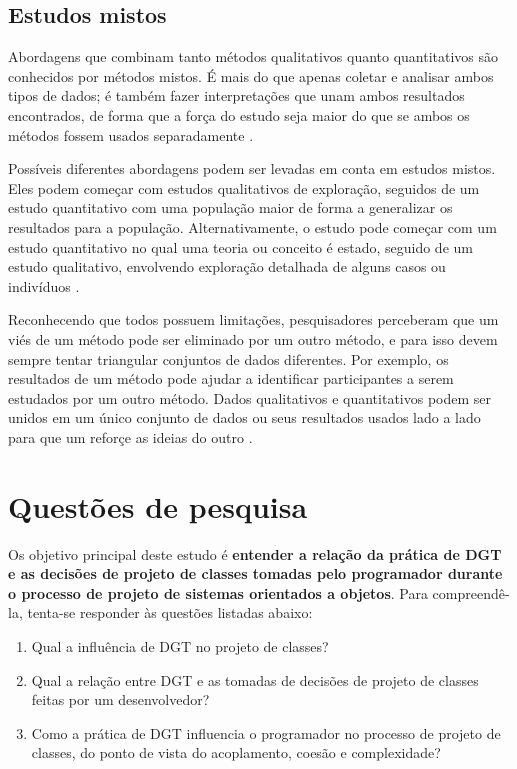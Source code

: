 \subsection{Estudos mistos}

Abordagens que combinam tanto métodos qualitativos quanto quantitativos são conhecidos por métodos mistos. 
É mais do que apenas coletar e analisar ambos tipos de dados; é também fazer interpretações que unam ambos
resultados encontrados, de forma que a força do estudo seja maior do que se ambos os métodos fossem
usados separadamente \cite{creswell}.

Possíveis diferentes abordagens podem ser levadas em conta em estudos mistos. Eles podem começar com estudos
qualitativos de exploração, seguidos de um estudo quantitativo com uma população maior de forma a
generalizar os resultados para a população. Alternativamente, o estudo pode começar com um estudo quantitativo
no qual uma teoria ou conceito é estado, seguido de um estudo qualitativo, envolvendo exploração detalhada
de alguns casos ou indivíduos \cite{creswell}.

Reconhecendo que todos possuem limitações, pesquisadores perceberam que um viés de um método pode ser eliminado
por um outro método, e para isso devem sempre tentar triangular conjuntos de dados diferentes.
Por exemplo, os resultados de um método pode ajudar a identificar participantes a serem estudados por um outro método.
Dados qualitativos e quantitativos podem ser unidos em um único conjunto de dados ou seus resultados usados
lado a lado para que um reforçe as ideias do outro \cite{creswell}.

\section{Questões de pesquisa}

Os objetivo principal deste estudo é \textbf{entender a relação da prática de DGT 
e as decisões de projeto de classes tomadas pelo programador durante o processo de 
projeto de sistemas orientados a objetos}.
Para compreendê-la, tenta-se responder às questões listadas
abaixo:

\begin{enumerate}

	\item Qual a influência de DGT no projeto de classes?

	\item Qual a relação entre DGT e as tomadas de decisões de projeto de classes
	feitas por um desenvolvedor?

	\item Como a prática de DGT influencia o programador no processo de  
	projeto de classes, do ponto de vista do acoplamento, coesão e complexidade?

\end{enumerate}

